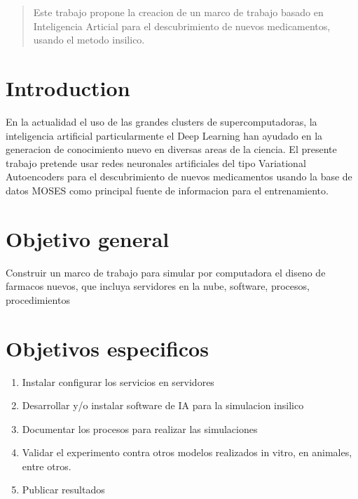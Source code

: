 \documentclass[12pt]{article}
\begin{document}
\maketitle

\begin{abstract}
Este trabajo propone la creacion de un marco de trabajo basado en Inteligencia Articial para el descubrimiento de nuevos medicamentos, usando el metodo insilico.
\end{abstract}

\section{Introduction}
En la actualidad el uso de las grandes clusters de supercomputadoras, la inteligencia artificial particularmente el Deep Learning han ayudado en la generacion de conocimiento nuevo en diversas areas de la ciencia. El presente trabajo pretende usar redes neuronales artificiales del tipo Variational Autoencoders para el descubrimiento de nuevos medicamentos usando la base de datos MOSES como principal fuente de informacion para el entrenamiento.


\section{Objetivo general}\label{Objetivo general}
Construir un marco de trabajo para simular por computadora el diseno de farmacos nuevos, que incluya servidores en la nube, software, procesos, procedimientos

\section{Objetivos especificos}\label{Objetivos especificos}
\begin{enumerate}
 \item Instalar configurar los servicios en servidores
 \item Desarrollar y/o instalar software de IA para la simulacion insilico
 \item Documentar los procesos para realizar las simulaciones
 \item Validar el experimento contra otros modelos realizados in vitro, en animales, entre otros.
 \item Publicar resultados
\end{enumerate}
\end{document}
